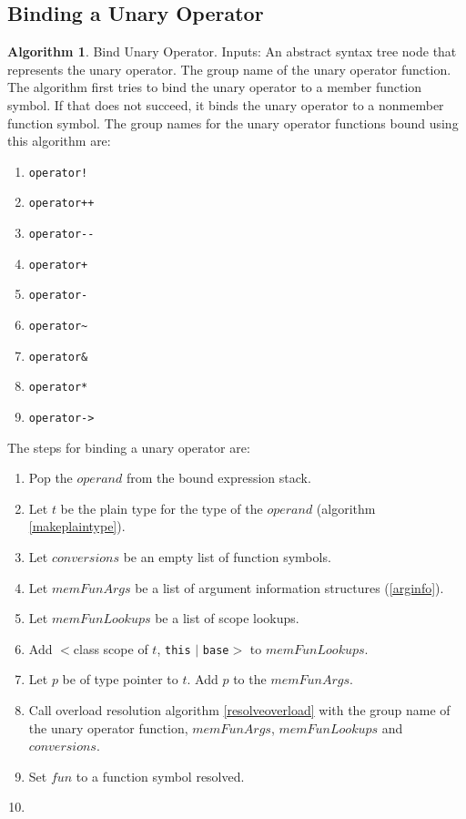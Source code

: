 \documentclass[a4paper,oneside,11pt]{book}
\theoremstyle{definition}
\newtheorem{algo}{Algorithm}[section]
\begin{document}
\subsection{Binding a Unary Operator}

\begin{algo}\label{bindunaryop} Bind Unary Operator.
Inputs: An abstract syntax tree node that represents the unary operator. The group name of the unary operator function.
The algorithm first tries to bind the unary operator to a member function symbol.
If that does not succeed, it binds the unary operator to a nonmember function symbol.
The group names for the unary operator functions bound using this algorithm are:
\begin{enumerate}
\item
\verb|operator!|
\item
\verb|operator++|
\item
\verb|operator--|
\item
\verb|operator+|
\item
\verb|operator-|
\item
\verb|operator~|
\item
\verb|operator&|
\item
\verb|operator*|
\item
\verb|operator->|
\end{enumerate}
The steps for binding a unary operator are:
\begin{enumerate}
\item
Pop the $operand$ from the bound expression stack.
\item
Let $t$ be the plain type for the type of the $operand$ (algorithm \ref{makeplaintype}).
\item
Let $conversions$ be an empty list of function symbols.
\item
Let $memFunArgs$ be a list of argument information structures (\ref{arginfo}).
\item
Let $memFunLookups$ be a list of scope lookups.
\item
Add $<$class scope of $t$, \verb|this| $|$ \verb|base|$>$ to $memFunLookups$.
\item
Let $p$ be of type pointer to $t$. Add $p$ to the $memFunArgs$.
\item
Call overload resolution algorithm \ref{resolveoverload} with the group name of the unary operator function, $memFunArgs$, $memFunLookups$ and $conversions$.
\item
Set $fun$ to a function symbol resolved.
\item

\end{enumerate}
\end{algo}
\end{document}
